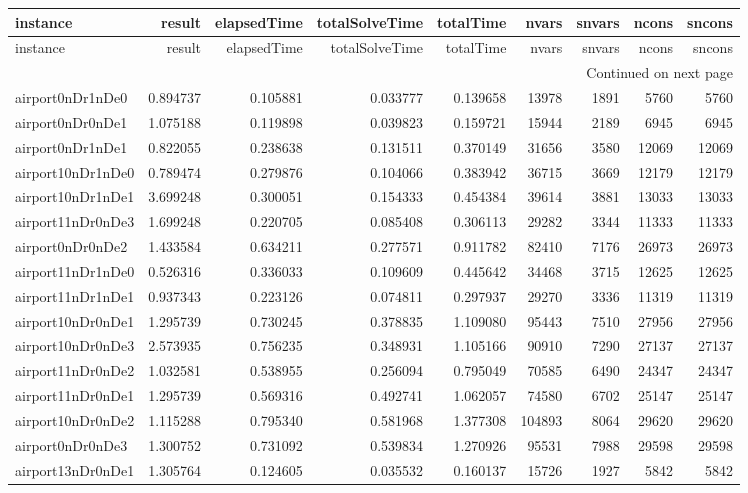 \documentclass[../../../thesis.tex]{subfiles}
\begin{document}
\tiny
\begin{longtable}{|l|r|r|r|r|r|r|r|r|}
\toprule
instance & result & elapsedTime & totalSolveTime & totalTime & nvars & snvars & ncons & sncons \\
\midrule
\endfirsthead
\toprule
instance & result & elapsedTime & totalSolveTime & totalTime & nvars & snvars & ncons & sncons \\
\midrule
\endhead
\midrule
\multicolumn{9}{r}{Continued on next page} \\
\midrule
\endfoot
\bottomrule
\endlastfoot
airport0nDr1nDe0 & 0.894737 & 0.105881 & 0.033777 & 0.139658 & 13978 & 1891 & 5760 & 5760 \\
airport0nDr0nDe1 & 1.075188 & 0.119898 & 0.039823 & 0.159721 & 15944 & 2189 & 6945 & 6945 \\
airport0nDr1nDe1 & 0.822055 & 0.238638 & 0.131511 & 0.370149 & 31656 & 3580 & 12069 & 12069 \\
airport10nDr1nDe0 & 0.789474 & 0.279876 & 0.104066 & 0.383942 & 36715 & 3669 & 12179 & 12179 \\
airport10nDr1nDe1 & 3.699248 & 0.300051 & 0.154333 & 0.454384 & 39614 & 3881 & 13033 & 13033 \\
airport11nDr0nDe3 & 1.699248 & 0.220705 & 0.085408 & 0.306113 & 29282 & 3344 & 11333 & 11333 \\
airport0nDr0nDe2 & 1.433584 & 0.634211 & 0.277571 & 0.911782 & 82410 & 7176 & 26973 & 26973 \\
airport11nDr1nDe0 & 0.526316 & 0.336033 & 0.109609 & 0.445642 & 34468 & 3715 & 12625 & 12625 \\
airport11nDr1nDe1 & 0.937343 & 0.223126 & 0.074811 & 0.297937 & 29270 & 3336 & 11319 & 11319 \\
airport10nDr0nDe1 & 1.295739 & 0.730245 & 0.378835 & 1.109080 & 95443 & 7510 & 27956 & 27956 \\
airport10nDr0nDe3 & 2.573935 & 0.756235 & 0.348931 & 1.105166 & 90910 & 7290 & 27137 & 27137 \\
airport11nDr0nDe2 & 1.032581 & 0.538955 & 0.256094 & 0.795049 & 70585 & 6490 & 24347 & 24347 \\
airport11nDr0nDe1 & 1.295739 & 0.569316 & 0.492741 & 1.062057 & 74580 & 6702 & 25147 & 25147 \\
airport10nDr0nDe2 & 1.115288 & 0.795340 & 0.581968 & 1.377308 & 104893 & 8064 & 29620 & 29620 \\
airport0nDr0nDe3 & 1.300752 & 0.731092 & 0.539834 & 1.270926 & 95531 & 7988 & 29598 & 29598 \\
airport13nDr0nDe1 & 1.305764 & 0.124605 & 0.035532 & 0.160137 & 15726 & 1927 & 5842 & 5842 \\

\end{longtable}
\end{document}
